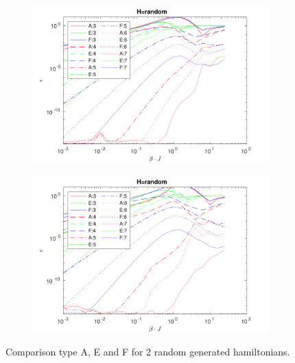 \begin{figure}
    \begin{subfigure}[]{\textwidth}
        \includegraphics[width=\textwidth]{Figuren/benchmarking/1D_Raand.pdf}
        \subcaption{}
    \end{subfigure}

    \begin{subfigure}[]{\textwidth}
        \includegraphics[width=\textwidth]{Figuren/benchmarking/1D_Raand_2.pdf}
        \subcaption{}
    \end{subfigure}

    \caption{Comparison type A, E and F for 2 random generated hamiltonians.}
    \label{fig:benchmark:trand}
\end{figure}


